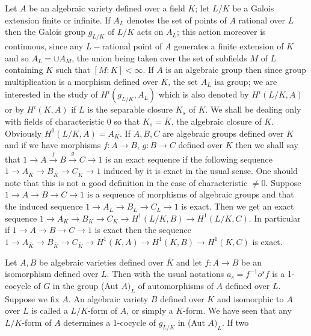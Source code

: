 Let $A$ be an algebraic variety defined over a field $K$; let $L/K$
be a Galois extension finite or infinite. If $A_{L}$ denotes  the set
of points of $A$ rational over $L$ then the Galois group  $g_{L/K}$ of
$L/K$ acts on $A_{L}$; this  action moreover is continuous, since
any $L-$rational point of $A$ generates a finite extension of $K$ and
so $A_{L} = \cup A_{M}$, the union being taken over the set of subfields
$M$ of $L$ containing $K$ such that $[M:K]< \infty$. If $A$ is an
algebraic group then since group multiplication is a morphism defined
over $K$, the set $A_{L}$ is\pageoriginale a group; we are interested
in the study 
of $H^{i} (g_{L/K},A_{L})$  which is also denoted by $H^{i} (L/K,A)$
or by $H^{i} (K,A)$ if $L$ is the separable  closure $K_{s}$ of
$K$. We shall be dealing only with fields of characteristic 0 so
that $K_s = \bar{K}$, the algebraic closure of $K$. Obviously $H^0
(L/K,A) = A_{K}$. If $A,B,C$  are algebraic groups  defined over
$K$ and if we have morphisms $f:A \rightarrow B$, $g:B
\rightarrow C$ defined over $K$ then we shall say that $1 \rightarrow A
\overset{f}{\rightarrow} B \overset{g}{\rightarrow} C \rightarrow 1$
is an exact sequence if the following sequence $1 \rightarrow
A_{\bar{K}} \rightarrow B_{\bar{K}} \rightarrow C_{\bar{K}}
\rightarrow 1$ induced by it is exact in the usual sense. One should
note that this is not a good definition in the case of characteristic
$\neq 0$. Suppose $1 \rightarrow A \rightarrow B \rightarrow C
\rightarrow 1$ is a sequence of morphisms of algebraic groups and that
the induced sequence   
$1 \rightarrow A_{L} \rightarrow B_{L} \rightarrow C_{L} \rightarrow
1$ is exact. Then we get an exact sequence  $1 \rightarrow A_{K}
\rightarrow B_{K} \rightarrow C_{K} \rightarrow H^{1} (L/K,B)
\rightarrow H^{1} (L/K,C)$. In particular if $1 \rightarrow A
\rightarrow B \rightarrow C \rightarrow 1$ is exact then the sequence
$1 \rightarrow A_{\bar{K}} \rightarrow B_{\bar{K}} \rightarrow
C_{\bar{K}} \rightarrow H^1 (K,A) \rightarrow H^{1} (K,B) \rightarrow
H^{1} (K,C)$ is exact. 

Let $A,B$ be algebraic varieties defined over $\bar{K}$ and let $f: A
\rightarrow B$ be an isomorphism defined over $L$. Then with the
usual notations $a_s = f^{-1} o^{s}f$ is a 1-cocycle of $G$ in the
group (Aut $A)_{L}$ of automorphisms of $A$ defined over $L$. Suppose
we fix $A$. An algebraic variety $B$ defined over $K$ and isomorphic
to $A$ over $L$ is called  a $L/K$-form  of $A$, or simply a
$K$-form. We have seen that any 
$L/K$-form of $A$ determines a 1-cocycle of $g_{L/K}$ in (Aut
$A)_{L}$. If two 


